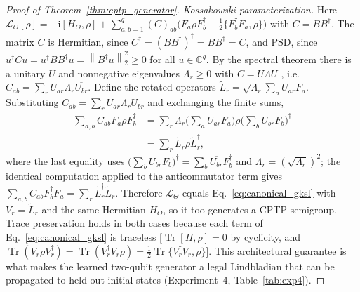 \documentclass[twocolumn,aps,prxquantum,superscriptaddress,nofootinbib,floatfix,longbibliography]{revtex4-2}
\DeclareMathOperator{\Tr}{Tr}
\newcommand{\C}{\mathbb{C}}
\newcommand{\calL}{\mathcal{L}}
\newcommand{\ii}{\mathrm{i}}
\newcommand{\norm}[1]{\left\lVert #1 \right\rVert}
\begin{document}
\begin{proof}[Proof of Theorem~\ref{thm:cptp_generator}]
\emph{Kossakowski parameterization.} Here $\calL_\Theta[\rho]=-\ii[H_\Theta,\rho]+\sum_{a,b=1}^q(C)_{ab}\big(F_a\rho F_b^\dagger-\tfrac12\{F_b^\dagger F_a,\rho\}\big)$ with $C=BB^\dagger$. The matrix $C$ is Hermitian, since $C^\dagger=(BB^\dagger)^\dagger=BB^\dagger=C$, and PSD, since $u^\dagger C u=u^\dagger BB^\dagger u=\norm{B^\dagger u}_2^2\ge0$ for all $u\in\C^q$. By the spectral theorem there is a unitary $U$ and nonnegative eigenvalues $\Lambda_r\ge0$ with $C=U\Lambda U^\dagger$, i.e.\ $C_{ab}=\sum_r U_{ar}\Lambda_r\overline{U_{br}}$. Define the rotated operators $\widetilde L_r=\sqrt{\Lambda_r}\sum_a U_{ar}F_a$. Substituting $C_{ab}=\sum_r U_{ar}\Lambda_r\overline{U_{br}}$ and exchanging the finite sums,
\begin{equation*}
\begin{aligned}
\sum_{a,b}C_{ab}F_a\rho F_b^\dagger&=\sum_r\Lambda_r\Big(\sum_a U_{ar}F_a\Big)\rho\Big(\sum_b U_{br}F_b\Big)^\dagger\\
&=\sum_r\widetilde L_r\rho\widetilde L_r^\dagger,
\end{aligned}
\end{equation*}
where the last equality uses $\big(\sum_b U_{br}F_b\big)^\dagger=\sum_b\overline{U_{br}}F_b^\dagger$ and $\Lambda_r=(\sqrt{\Lambda_r})^2$; the identical computation applied to the anticommutator term gives $\sum_{a,b}C_{ab}F_b^\dagger F_a=\sum_r\widetilde L_r^\dagger\widetilde L_r$. Therefore $\calL_\Theta$ equals Eq.~\eqref{eq:canonical_gksl} with $V_r=\widetilde L_r$ and the same Hermitian $H_\Theta$, so it too generates a CPTP semigroup. Trace preservation holds in both cases because each term of Eq.~\eqref{eq:canonical_gksl} is traceless [$\Tr[H,\rho]=0$ by cyclicity, and $\Tr(V_r\rho V_r^\dagger)=\Tr(V_r^\dagger V_r\rho)=\tfrac12\Tr\{V_r^\dagger V_r,\rho\}$]. This architectural guarantee is what makes the learned two-qubit generator a legal Lindbladian that can be propagated to held-out initial states (Experiment~4, Table~\ref{tab:exp4}).
\end{proof}
\end{document}
